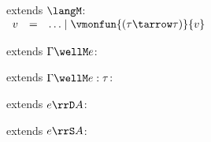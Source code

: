 \begin{flushleft}

 extends $\langM$:\\
$\begin{array}{l c l}
  v & = & \ldots \mid \vmonfun{(\tau\tarrow\tau)}{v}
\end{array}$

\medskip
\begin{minipage}[t]{0.5\textwidth}
 extends $\Gamma \wellM e$:
\begin{mathpar}
\end{mathpar}
\end{minipage}%
\begin{minipage}[t]{0.5\textwidth}
 extends $\Gamma \wellM e : \tau$:
\begin{mathpar}
\end{mathpar}
\end{minipage}

\medskip
\begin{minipage}[t]{0.5\textwidth}
 extends $e \rrD A$:
\begin{mathpar}
\end{mathpar}
\end{minipage}%
\begin{minipage}[t]{0.5\textwidth}
 extends $e \rrS A$:
\begin{mathpar}
\end{mathpar}
\end{minipage}%

\medskip
{}
\begin{mathpar}


\end{mathpar}
\end{flushleft}
